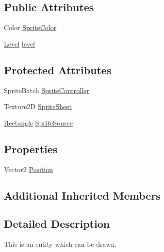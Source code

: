 \subsection*{Public Attributes}
\begin{DoxyCompactItemize}
\item 
Color \hyperlink{class_athena_engine_1_1_framework_1_1_primatives_1_1_drawable_entity_a3cc20798a1dfd7ad8ff90b3e95fe63cc}{Sprite\-Color}
\item 
\hyperlink{class_athena_engine_1_1_framework_1_1_gameplay_1_1_level}{Level} \hyperlink{class_athena_engine_1_1_framework_1_1_primatives_1_1_drawable_entity_a8c9db75b5a1d3222ebe2597f760ff8e1}{level}
\end{DoxyCompactItemize}
\subsection*{Protected Attributes}
\begin{DoxyCompactItemize}
\item 
Sprite\-Batch \hyperlink{class_athena_engine_1_1_framework_1_1_primatives_1_1_drawable_entity_a22d0ed3b29d7693933d2be861b6b6971}{Sprite\-Controller}
\item 
Texture2\-D \hyperlink{class_athena_engine_1_1_framework_1_1_primatives_1_1_drawable_entity_a667a51ee645b86389795eb0e132f9534}{Sprite\-Sheet}
\item 
\hyperlink{class_athena_engine_1_1_framework_1_1_primatives_1_1_entity_a7d7668b0626f6b13a6926fea2ce06750}{Rectangle} \hyperlink{class_athena_engine_1_1_framework_1_1_primatives_1_1_drawable_entity_a27c0d8c1dd1000a454cff027372edb64}{Sprite\-Source}
\end{DoxyCompactItemize}
\subsection*{Properties}
\begin{DoxyCompactItemize}
\item 
Vector2 \hyperlink{class_athena_engine_1_1_framework_1_1_primatives_1_1_drawable_entity_ae4b9539a2dd0df69e0230a9d5e31c133}{Position}
\end{DoxyCompactItemize}
\subsection*{Additional Inherited Members}


\subsection{Detailed Description}
This is an entity which can be drawn. 



